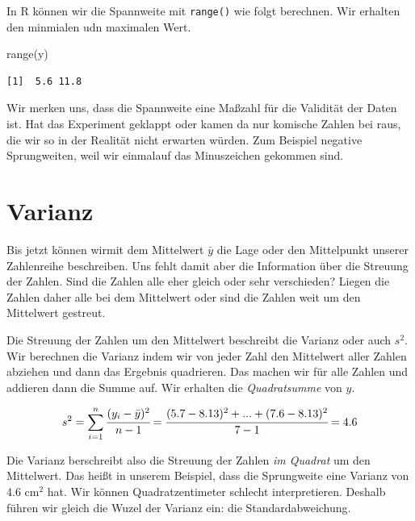 \documentclass[
  letterpaper,
  DIV=11,
  oneside]{scrreport}
\newenvironment{Shaded}{\begin{snugshade}}{\end{snugshade}}
\newcommand{\FunctionTok}[1]{\textcolor[rgb]{0.28,0.35,0.67}{#1}}
\newcommand{\NormalTok}[1]{\textcolor[rgb]{0.00,0.23,0.31}{#1}}
\begin{document}
In R können wir die Spannweite mit \texttt{range()} wie folgt berechnen.
Wir erhalten den minmialen udn maximalen Wert.

\begin{Shaded}
\begin{Highlighting}[]
\FunctionTok{range}\NormalTok{(y) }
\end{Highlighting}
\end{Shaded}

\begin{verbatim}
[1]  5.6 11.8
\end{verbatim}

Wir merken uns, dass die Spannweite eine Maßzahl für die Validität der
Daten ist. Hat das Experiment geklappt oder kamen da nur komische Zahlen
bei raus, die wir so in der Realität nicht erwarten würden. Zum Beispiel
negative Sprungweiten, weil wir einmalauf das Minuszeichen gekommen
sind.

\hypertarget{varianz}{%
\section{Varianz}\label{varianz}}

Bis jetzt können wirmit dem Mittelwert \(\bar{y}\) die Lage oder den
Mittelpunkt unserer Zahlenreihe beschreiben. Uns fehlt damit aber die
Information über die Streuung der Zahlen. Sind die Zahlen alle eher
gleich oder sehr verschieden? Liegen die Zahlen daher alle bei dem
Mittelwert oder sind die Zahlen weit um den Mittelwert gestreut.

Die Streuung der Zahlen um den Mittelwert beschreibt die Varianz oder
auch \(s^2\). Wir berechnen die Varianz indem wir von jeder Zahl den
Mittelwert aller Zahlen abziehen und dann das Ergebnis quadrieren. Das
machen wir für alle Zahlen und addieren dann die Summe auf. Wir erhalten
die \emph{Quadratsumme} von \(y\).

{}

\[
s^2 = \sum_{i=1}^n\cfrac{(y_i - \bar{y})^2}{n-1} = \cfrac{(5.7 -
8.13)^2 + ... + (7.6 - 8.13)^2}{7-1} = 4.6
\]

Die Varianz berschreibt also die Streuung der Zahlen \emph{im Quadrat}
um den Mittelwert. Das heißt in unserem Beispiel, dass die Sprungweite
eine Varianz von 4.6 cm\(^2\) hat. Wir können Quadratzentimeter schlecht
interpretieren. Deshalb führen wir gleich die Wuzel der Varianz ein: die
Standardabweichung.
\end{document}
